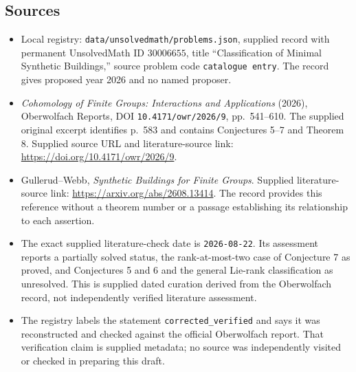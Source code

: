 \documentclass[11pt]{article}
\begin{document}
\subsection{Sources}
\begin{itemize}
\item Local registry: \texttt{data/unsolvedmath/problems.json}, supplied record with permanent UnsolvedMath ID \(30006655\), title ``Classification of Minimal Synthetic Buildings,'' source problem code \texttt{catalogue entry}. The record gives proposed year 2026 and no named proposer.
\item \emph{Cohomology of Finite Groups: Interactions and Applications} (2026), Oberwolfach Reports, DOI \texttt{10.4171/owr/2026/9}, pp.\ 541--610. The supplied original excerpt identifies p.\ 583 and contains Conjectures 5--7 and Theorem 8. Supplied source URL and literature-source link: \url{https://doi.org/10.4171/owr/2026/9}.
\item Gullerud--Webb, \emph{Synthetic Buildings for Finite Groups}. Supplied literature-source link: \url{https://arxiv.org/abs/2608.13414}. The record provides this reference without a theorem number or a passage establishing its relationship to each assertion.
\item The exact supplied literature-check date is \texttt{2026-08-22}. Its assessment reports a partially solved status, the rank-at-most-two case of Conjecture 7 as proved, and Conjectures 5 and 6 and the general Lie-rank classification as unresolved. This is supplied dated curation derived from the Oberwolfach record, not independently verified literature assessment.
\item The registry labels the statement \texttt{corrected\_verified} and says it was reconstructed and checked against the official Oberwolfach report. That verification claim is supplied metadata; no source was independently visited or checked in preparing this draft.
\end{itemize}
\end{document}
